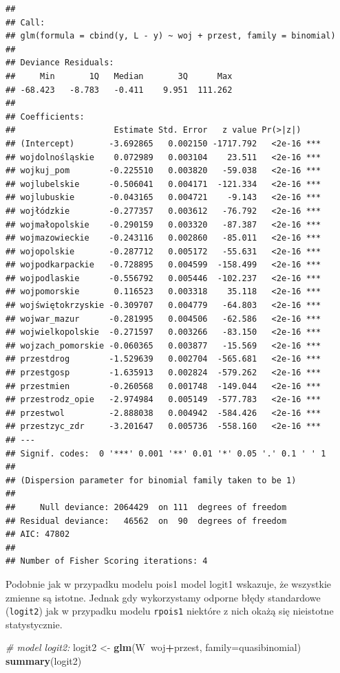 \documentclass[polish,]{book}
\newenvironment{Shaded}{\begin{snugshade}}{\end{snugshade}}
\newcommand{\CommentTok}[1]{\textcolor[rgb]{0.56,0.35,0.01}{\textit{#1}}}
\newcommand{\DataTypeTok}[1]{\textcolor[rgb]{0.13,0.29,0.53}{#1}}
\newcommand{\KeywordTok}[1]{\textcolor[rgb]{0.13,0.29,0.53}{\textbf{#1}}}
\newcommand{\NormalTok}[1]{#1}
\newcommand{\OperatorTok}[1]{\textcolor[rgb]{0.81,0.36,0.00}{\textbf{#1}}}
\newcommand{\StringTok}[1]{\textcolor[rgb]{0.31,0.60,0.02}{#1}}
\begin{document}
\begin{verbatim}
## 
## Call:
## glm(formula = cbind(y, L - y) ~ woj + przest, family = binomial)
## 
## Deviance Residuals: 
##     Min       1Q   Median       3Q      Max  
## -68.423   -8.783   -0.411    9.951  111.262  
## 
## Coefficients:
##                    Estimate Std. Error   z value Pr(>|z|)    
## (Intercept)       -3.692865   0.002150 -1717.792   <2e-16 ***
## wojdolnośląskie    0.072989   0.003104    23.511   <2e-16 ***
## wojkuj_pom        -0.225510   0.003820   -59.038   <2e-16 ***
## wojlubelskie      -0.506041   0.004171  -121.334   <2e-16 ***
## wojlubuskie       -0.043165   0.004721    -9.143   <2e-16 ***
## wojłódzkie        -0.277357   0.003612   -76.792   <2e-16 ***
## wojmałopolskie    -0.290159   0.003320   -87.387   <2e-16 ***
## wojmazowieckie    -0.243116   0.002860   -85.011   <2e-16 ***
## wojopolskie       -0.287712   0.005172   -55.631   <2e-16 ***
## wojpodkarpackie   -0.728895   0.004599  -158.499   <2e-16 ***
## wojpodlaskie      -0.556792   0.005446  -102.237   <2e-16 ***
## wojpomorskie       0.116523   0.003318    35.118   <2e-16 ***
## wojświętokrzyskie -0.309707   0.004779   -64.803   <2e-16 ***
## wojwar_mazur      -0.281995   0.004506   -62.586   <2e-16 ***
## wojwielkopolskie  -0.271597   0.003266   -83.150   <2e-16 ***
## wojzach_pomorskie -0.060365   0.003877   -15.569   <2e-16 ***
## przestdrog        -1.529639   0.002704  -565.681   <2e-16 ***
## przestgosp        -1.635913   0.002824  -579.262   <2e-16 ***
## przestmien        -0.260568   0.001748  -149.044   <2e-16 ***
## przestrodz_opie   -2.974984   0.005149  -577.783   <2e-16 ***
## przestwol         -2.888038   0.004942  -584.426   <2e-16 ***
## przestzyc_zdr     -3.201647   0.005736  -558.160   <2e-16 ***
## ---
## Signif. codes:  0 '***' 0.001 '**' 0.01 '*' 0.05 '.' 0.1 ' ' 1
## 
## (Dispersion parameter for binomial family taken to be 1)
## 
##     Null deviance: 2064429  on 111  degrees of freedom
## Residual deviance:   46562  on  90  degrees of freedom
## AIC: 47802
## 
## Number of Fisher Scoring iterations: 4
\end{verbatim}

Podobnie jak w przypadku modelu pois1 model logit1 wskazuje, że wszystkie
zmienne są istotne. Jednak gdy wykorzystamy odporne błędy standardowe (\texttt{logit2})
jak w przypadku modelu \texttt{rpois1} niektóre z nich okażą się nieistotne statystycznie.

\begin{Shaded}
\begin{Highlighting}[]
\CommentTok{# model logit2:}
\NormalTok{logit2 <-}\StringTok{ }\KeywordTok{glm}\NormalTok{(W}\OperatorTok{~}\NormalTok{woj}\OperatorTok{+}\NormalTok{przest, }\DataTypeTok{family=}\NormalTok{quasibinomial)}
\KeywordTok{summary}\NormalTok{(logit2)}
\end{Highlighting}
\end{Shaded}
\end{document}
